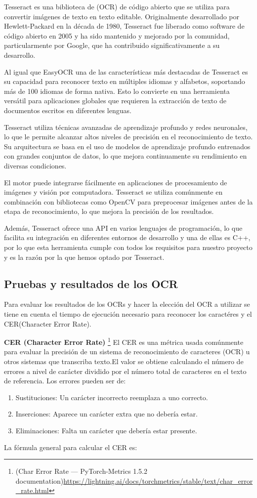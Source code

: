\begin{enumerate}
	Tesseract es una biblioteca de (OCR) de código abierto que se utiliza para convertir imágenes de texto en texto editable. Originalmente desarrollado por Hewlett-Packard en la década de 1980, Tesseract fue liberado como software de código abierto en 2005 y ha sido mantenido y mejorado por la comunidad, particularmente por Google, que ha contribuido significativamente a su desarrollo.
	
	Al igual que EasyOCR una de las características más destacadas de Tesseract es su capacidad para reconocer texto en múltiples idiomas y alfabetos, soportando más de 100 idiomas de forma nativa. Esto lo convierte en una herramienta versátil para aplicaciones globales que requieren la extracción de texto de documentos escritos en diferentes lenguas.
	
	Tesseract utiliza técnicas avanzadas de aprendizaje profundo y redes neuronales, lo que le permite alcanzar altos niveles de precisión en el reconocimiento de texto. Su arquitectura se basa en el uso de modelos de aprendizaje profundo entrenados con grandes conjuntos de datos, lo que mejora continuamente su rendimiento en diversas condiciones.
	
	El motor puede integrarse fácilmente en aplicaciones de procesamiento de imágenes y visión por computadora. Tesseract se utiliza comúnmente en combinación con bibliotecas como OpenCV para preprocesar imágenes antes de la etapa de reconocimiento, lo que mejora la precisión de los resultados.
	
	Además, Tesseract ofrece una API en varios lenguajes de programación, lo que facilita su integración en diferentes entornos de desarrollo y una de ellas es C++, por lo que esta herramienta cumple con todos los requisitos para nuestro proyecto y es la razón por la que hemos optado por Tesseract.
\end{enumerate}
\subsection{Pruebas y resultados de los OCR}
Para evaluar los resultados de los OCRs y hacer la elección del OCR a utilizar se tiene en cuenta el tiempo de ejecución necesario para reconocer los caractéres y el CER(Character Error Rate).


\textbf{CER (Character Error Rate)} \footnote{(Char Error Rate — PyTorch-Metrics 1.5.2 documentation)\url{https://lightning.ai/docs/torchmetrics/stable/text/char_error_rate.html} }
El CER es una métrica usada comúnmente para evaluar la precisión de un sistema de reconocimiento de caracteres (OCR) u otros sistemas que transcriba texto.El valor se obtiene calculando el número de errores a nivel de carácter dividido por el número total de caracteres en el texto de referencia.
Los errores pueden ser de:
\begin{enumerate}
	\item Sustituciones: Un carácter incorrecto reemplaza a uno correcto.
	\item Inserciones: Aparece un carácter extra que no debería estar.
	\item Eliminaciones: Falta un carácter que debería estar presente.
\end{enumerate}
La fórmula general para calcular el CER es:
	
